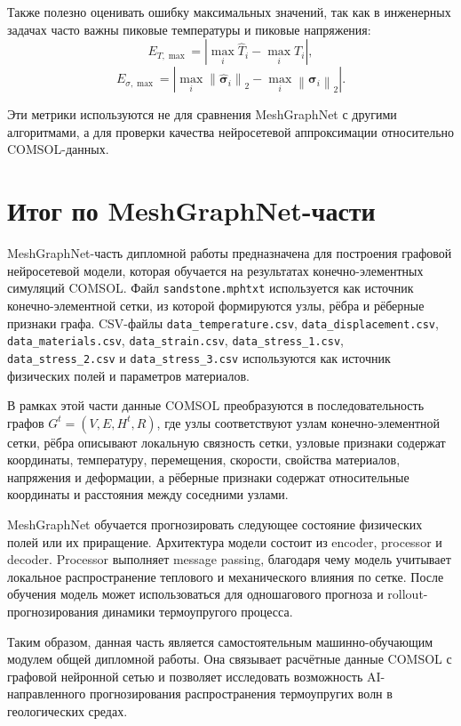 Также полезно оценивать ошибку максимальных значений, так как в инженерных задачах часто важны пиковые температуры и пиковые напряжения:
\begin{equation}
    E_{T,\max}=\left|\max_i \hat{T}_i-\max_i T_i\right|,
\end{equation}
\begin{equation}
    E_{\sigma,\max}=\left|\max_i \left\|\hat{\boldsymbol{\sigma}}_i\right\|_2-\max_i \left\|\boldsymbol{\sigma}_i\right\|_2\right|.
\end{equation}

Эти метрики используются не для сравнения MeshGraphNet с другими алгоритмами, а для проверки качества нейросетевой аппроксимации относительно COMSOL-данных.

\section{Итог по MeshGraphNet-части}

MeshGraphNet-часть дипломной работы предназначена для построения графовой нейросетевой модели, которая обучается на результатах конечно-элементных симуляций COMSOL. Файл \texttt{sandstone.mphtxt} используется как источник конечно-элементной сетки, из которой формируются узлы, рёбра и рёберные признаки графа. CSV-файлы \texttt{data\_temperature.csv}, \texttt{data\_displacement.csv}, \texttt{data\_materials.csv}, \texttt{data\_strain.csv}, \texttt{data\_stress\_1.csv}, \texttt{data\_stress\_2.csv} и \texttt{data\_stress\_3.csv} используются как источник физических полей и параметров материалов.

В рамках этой части данные COMSOL преобразуются в последовательность графов $G^t=(V,E,H^t,R)$, где узлы соответствуют узлам конечно-элементной сетки, рёбра описывают локальную связность сетки, узловые признаки содержат координаты, температуру, перемещения, скорости, свойства материалов, напряжения и деформации, а рёберные признаки содержат относительные координаты и расстояния между соседними узлами.

MeshGraphNet обучается прогнозировать следующее состояние физических полей или их приращение. Архитектура модели состоит из encoder, processor и decoder. Processor выполняет message passing, благодаря чему модель учитывает локальное распространение теплового и механического влияния по сетке. После обучения модель может использоваться для одношагового прогноза и rollout-прогнозирования динамики термоупругого процесса.

Таким образом, данная часть является самостоятельным машинно-обучающим модулем общей дипломной работы. Она связывает расчётные данные COMSOL с графовой нейронной сетью и позволяет исследовать возможность AI-направленного прогнозирования распространения термоупругих волн в геологических средах.
